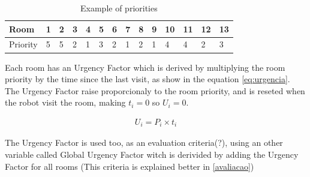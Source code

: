 \documentclass[9pt,journal]{IEEEtran}
\begin{document}
\begin{table}%
\centering
\caption{Example of priorities}
\begin{tabular}{|l|l|l|l|l|l|l|l|l|l|l|l|l|l|}
\hline
Room & 1 & 2 & 3 & 4 & 5 & 6 & 7 & 8 & 9 & 10 & 11 & 12 & 13 \\ 
\hline
Priority & 5 & 5 & 2 & 1 & 3 & 2 & 1 & 2 & 1 & 4 & 4 & 2 & 3 \\ 
\hline
\end{tabular}
\label{tab:exemplo}
\end{table}

Each room has an Urgency Factor which is derived by multiplying the room priority by the time since the last visit, as show in the equation \ref{eq:urgencia}. The Urgency Factor raise proporcionaly to the room priority, and is reseted when the robot visit the room, making $t_i=0$ so $U_i = 0$.

\begin{eqnarray}
U_i= P_i \times t_i
\label{eq:urgencia}
\end{eqnarray}

The Urgency Factor is used too, as an evaluation criteria(?), using an other variable called Global Urgency Factor witch is derivided by adding the Urgency Factor for all rooms (This criteria is explained better in \ref{avaliacao})







	
	
\end{document}
